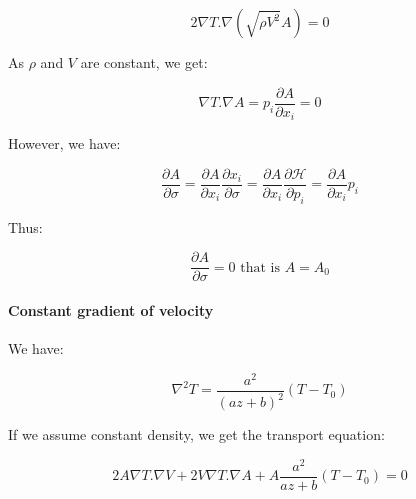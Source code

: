 \documentclass[main.tex]{subfiles}
\begin{document}
\begin{equation}
2 \nabla T . \nabla (\sqrt{\rho V^2} A) = 0
\end{equation}

As $\rho$ and $V$ are constant, we get:

\begin{equation}
\nabla T . \nabla A = p_i \frac{\partial A}{\partial x_i} = 0
\end{equation}

However, we have:

\begin{equation}
\frac{\partial A}{\partial \sigma} = \frac{\partial A}{\partial x_i} \frac{\partial x_i}{\partial \sigma} = \frac{\partial A}{\partial x_i} \frac{\partial \mathcal H}{\partial p_i} = \frac{\partial A}{\partial x_i} p_i
\end{equation}

Thus:

\begin{equation}
\frac{\partial A}{\partial \sigma} = 0 \text{ that is } A = A_0
\end{equation}

\paragraph{Constant gradient of velocity}

We have:

\begin{equation}
\nabla^2 T = \frac{a^2}{(a z + b)^2} (T - T_0)
\end{equation}

If we assume constant density, we get the transport equation:

\begin{equation}
2 A \nabla T . \nabla V + 2 V \nabla T . \nabla A + A \frac{a^2}{a z + b} (T - T_0) = 0
\end{equation}
\end{document}
